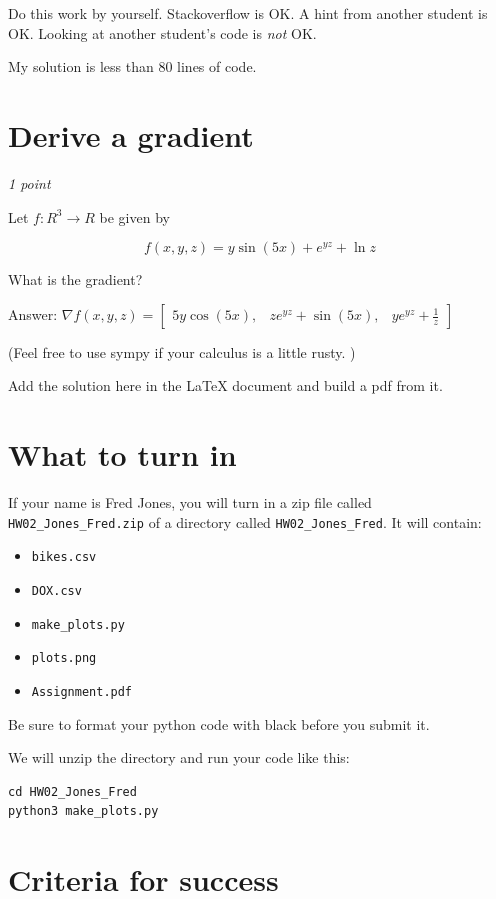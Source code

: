 \documentclass[11pt,english]{article}
\begin{document}
Do this work by yourself.   Stackoverflow is OK.   A hint from another student is OK.  Looking at another student's code is \emph{not} OK.

My solution is less than 80 lines of code.

\section{Derive a gradient}

\textit{1 point}

Let $f: R^3 \rightarrow R$ be given by

$$f(x, y,z) = y\sin(5x) + e^{yz} + \ln{z}$$

What is the gradient?

Answer: $\nabla f(x,y,z) =\begin{bmatrix} 5 y \cos{\left(5 x \right)},& z e^{y z} + \sin{\left(5 x \right)},& y e^{y z} + \frac{1}{z} \end{bmatrix}$

(Feel free to use sympy  if your calculus is a little rusty. )

Add the solution here in the LaTeX document and build a pdf from it.

\section{What to turn in}

If your name is Fred Jones, you will turn in a zip file called  \texttt{HW02\_Jones\_Fred.zip} of a directory called  \texttt{HW02\_Jones\_Fred}.  It will contain:
\begin{itemize}
\item \texttt{bikes.csv}
\item \texttt{DOX.csv}
\item \texttt{make\_plots.py}
\item \texttt{plots.png}
\item \texttt{Assignment.pdf}
\end{itemize}

Be sure to format your python code with black before you submit it.

We will unzip the directory and run your code like this:
\begin{verbatim}
cd HW02_Jones_Fred
python3 make_plots.py
\end{verbatim}

\section{Criteria for success}
\end{document}
